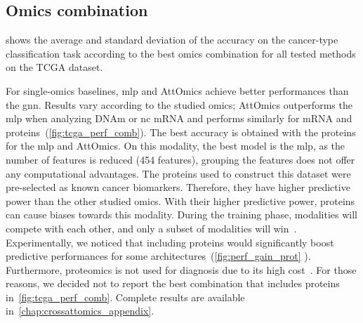 \documentclass[../main.tex]{subfiles}
\begin{document}
	\subsection{Omics combination}
	     shows the average and standard deviation of the accuracy on the cancer-type classification task according to the best omics combination for all tested methods on the TCGA dataset.

	    For single-omics baselines, \gls{mlp} and AttOmics achieve better performances than the \gls{gnn}.
	    Results vary according to the studied omics; AttOmics outperforms the \gls{mlp} when analyzing DNAm or nc mRNA and performs similarly for mRNA and proteins~(\cref{fig:tcga_perf_comb}).
	    The best accuracy is obtained with the proteins for the \gls{mlp} and AttOmics.
	    On this modality, the best model is the \gls{mlp}, as the number of features is reduced (454 features), grouping the features does not offer any computational advantages.
	    The proteins used to construct this dataset were pre-selected as known cancer biomarkers.
	    Therefore, they have higher predictive power than the other studied omics.
	    With their higher predictive power, proteins can cause biases towards this modality.
	    During the training phase, modalities will compete with each other, and only a subset of modalities will win~\cite{pmlr-v162-huang22e}.
	    Experimentally, we noticed that including proteins would significantly boost predictive performances for some architectures~(\cref{fig:perf_gain_prot}
	    ).
	    Furthermore, proteomics is not used for diagnosis due to its high cost~\cite{Mundt2023}.
	    For those reasons, we decided not to report the best combination that includes proteins in~\cref{fig:tcga_perf_comb}.
	    Complete results are available in~\cref{chap:crossattomics_appendix}.
\end{document}
